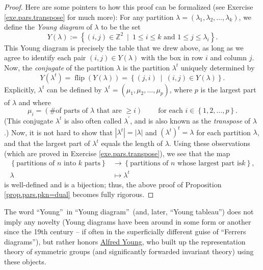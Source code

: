 \begin{proof}
Here are some pointers to how this proof can be formalized (see Exercise
\ref{exe.pars.transpose} for much more): For any partition $\lambda=\left(
\lambda_{1},\lambda_{2},\ldots,\lambda_{k}\right)  $, we define the
\emph{Young diagram} of $\lambda$ to be the set%
\[
Y\left(  \lambda\right)  :=\left\{  \left(  i,j\right)  \in\mathbb{Z}%
^{2}\ \mid\ 1\leq i\leq k\text{ and }1\leq j\leq\lambda_{i}\right\}  .
\]
This Young diagram is precisely the table that we drew above, as long as we
agree to identify each pair $\left(  i,j\right)  \in Y\left(  \lambda\right)
$ with the box in row $i$ and column $j$. Now, the \emph{conjugate} of the
partition $\lambda$ is the partition $\lambda^{t}$ uniquely determined by%
\[
Y\left(  \lambda^{t}\right)  =\operatorname*{flip}\left(  Y\left(
\lambda\right)  \right)  =\left\{  \left(  j,i\right)  \ \mid\ \left(
i,j\right)  \in Y\left(  \lambda\right)  \right\}  .
\]
Explicitly, $\lambda^{t}$ can be defined by $\lambda^{t}=\left(  \mu_{1}%
,\mu_{2},\ldots,\mu_{p}\right)  $, where $p$ is the largest part of $\lambda$
and where%
\[
\mu_{i}=\left(  \text{\# of parts of }\lambda\text{ that are }\geq i\right)
\ \ \ \ \ \ \ \ \ \ \text{for each }i\in\left\{  1,2,\ldots,p\right\}  .
\]
(This conjugate $\lambda^{t}$ is also often called $\lambda^{\prime}$, and is
also known as the \emph{transpose} of $\lambda$.) Now, it is not hard to show
that $\left\vert \lambda^{t}\right\vert =\left\vert \lambda\right\vert $ and
$\left(  \lambda^{t}\right)  ^{t}=\lambda$ for each partition $\lambda$, and
that the largest part of $\lambda^{t}$ equals the length of $\lambda$. Using
these observations (which are proved in Exercise \ref{exe.pars.transpose}), we
see that the map%
\begin{align*}
\left\{  \text{partitions of }n\text{ into }k\text{ parts}\right\}   &
\rightarrow\left\{  \text{partitions of }n\text{ whose largest part is
}k\right\}  ,\\
\lambda &  \mapsto\lambda^{t}%
\end{align*}
is well-defined and is a bijection; thus, the above proof of Proposition
\ref{prop.pars.pkn=dual} becomes fully rigorous.
\end{proof}

The word \textquotedblleft Young\textquotedblright\ in \textquotedblleft Young
diagram\textquotedblright\ (and, later, \textquotedblleft Young
tableau\textquotedblright) does not imply any novelty (Young diagrams have
been around in some form or another since the 19th century -- if often in the
superficially different guise of \textquotedblleft Ferrers
diagrams\textquotedblright), but rather honors
\href{https://en.wikipedia.org/wiki/Alfred_Young}{Alfred Young}, who built up
the representation theory of symmetric groups (and significantly forwarded
invariant theory) using these objects.

